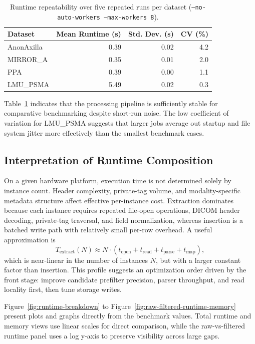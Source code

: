\begin{table}[htbp]
\centering
\caption{Runtime repeatability over five repeated runs per dataset (\texttt{--no-auto-workers --max-workers 8}).}
\label{tab:runtime-repeatability}
\begin{tabular}{l r r r}
\toprule
Dataset & Mean Runtime (s) & Std. Dev. (s) & CV (\%) \\
\midrule
AnonAxilla & 0.39 & 0.02 & 4.2 \\
MIRROR\_A  & 0.35 & 0.01 & 2.0 \\
PPA        & 0.39 & 0.00 & 1.1 \\
LMU\_PSMA  & 5.49 & 0.02 & 0.3 \\
\bottomrule
\end{tabular}
\end{table}

Table~\ref{tab:runtime-repeatability} indicates that the processing pipeline is sufficiently stable for comparative benchmarking despite short-run noise. The low coefficient of variation for LMU\_PSMA suggests that larger jobs average out startup and file system jitter more effectively than the smallest benchmark cases.

\subsection{Interpretation of Runtime Composition}
On a given hardware platform, execution time is not determined solely by instance count. Header complexity, private-tag volume, and modality-specific metadata structure affect effective per-instance cost. Extraction dominates because each instance requires repeated file-open operations, DICOM header decoding, private-tag traversal, and field normalization, whereas insertion is a batched write path with relatively small per-row overhead. A useful approximation is
\[
T_{\text{extract}}(N) \approx N \cdot (t_{\text{open}} + t_{\text{read}} + t_{\text{parse}} + t_{\text{map}}),
\]
which is near-linear in the number of instances \(N\), but with a larger constant factor than insertion. This profile suggests an optimization order driven by the front stage: improve candidate prefilter precision, parser throughput, and read locality first, then tune storage writes.

Figure~\ref{fig:runtime-breakdown} to Figure~\ref{fig:raw-filtered-runtime-memory} present plots and graphs directly from the benchmark values. Total runtime and memory views use linear scales for direct comparison, while the raw-vs-filtered runtime panel uses a log y-axis to preserve visibility across large gaps.


